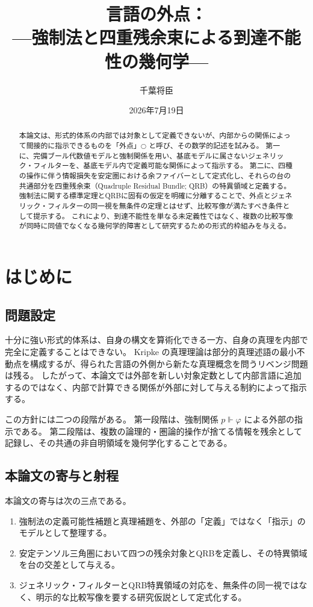 \documentclass[11pt]{ltjsarticle}
\title{言語の外点：\\
---強制法と四重残余束による到達不能性の幾何学---}
\author{千葉将臣}
\date{2026年7月19日}
\theoremstyle{plain}
\theoremstyle{definition}
\newcommand{\dfix}{\bigcirc}
\begin{document}
\maketitle

\begin{abstract}
本論文は、形式的体系の内部では対象として定義できないが、内部からの関係によって間接的に指示できるものを「外点」\(\dfix\) と呼び、その数学的記述を試みる。
第一に、完備ブール代数値モデルと強制関係を用い、基底モデルに属さないジェネリック・フィルターを、基底モデル内で定義可能な関係によって指示する。
第二に、四種の操作に伴う情報損失を安定圏における余ファイバーとして定式化し、それらの台の共通部分を四重残余束（Quadruple Residual Bundle; QRB）の特異領域と定義する。
強制法に関する標準定理とQRBに固有の仮定を明確に分離することで、外点とジェネリック・フィルターの同一視を無条件の定理とはせず、比較写像が満たすべき条件として提示する。
これにより、到達不能性を単なる未定義性ではなく、複数の比較写像が同時に同値でなくなる幾何学的障害として研究するための形式的枠組みを与える。
\end{abstract}

\section{はじめに}

\subsection{問題設定}

十分に強い形式的体系は、自身の構文を算術化できる一方、自身の真理を内部で完全に定義することはできない\cite{godel1931,tarski1936}。
Kripke の真理理論は部分的真理述語の最小不動点を構成するが、得られた言語の外側から新たな真理概念を問うリベンジ問題は残る\cite{kripke1975}。
したがって、本論文では外部を新しい対象定数として内部言語に追加するのではなく、内部で計算できる関係が外部に対して与える制約によって指示する。

この方針には二つの段階がある。
第一段階は、強制関係 \(p\Vdash\varphi\) による外部の指示である。
第二段階は、複数の論理的・圏論的操作が捨てる情報を残余として記録し、その共通の非自明領域を幾何学化することである。

\subsection{本論文の寄与と射程}

本論文の寄与は次の三点である。
\begin{enumerate}
\item 強制法の定義可能性補題と真理補題を、外部の「定義」ではなく「指示」のモデルとして整理する。
\item 安定テンソル三角圏において四つの残余対象とQRBを定義し、その特異領域を台の交差として与える。
\item ジェネリック・フィルターとQRB特異領域の対応を、無条件の同一視ではなく、明示的な比較写像を要する研究仮説として定式化する。
\end{enumerate}
\end{document}
